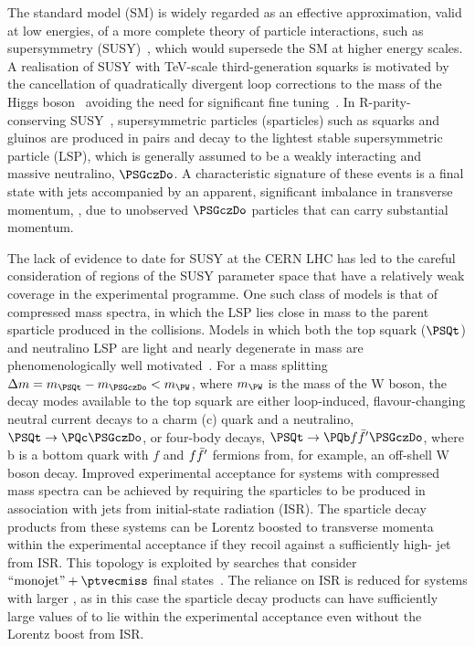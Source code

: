 The standard model (SM) is widely regarded as an effective
approximation, valid at low energies, of a more complete theory of
particle interactions, such as supersymmetry (SUSY)~\cite{ref:SUSY-1,
  ref:SUSY0, ref:SUSY1, ref:SUSY2, ref:SUSY3, ref:SUSY4,
  ref:hierarchy1, ref:hierarchy2}, which would supersede the SM at
higher energy scales. A realisation of SUSY with TeV-scale
third-generation squarks is motivated by the cancellation of
quadratically divergent loop corrections to the mass of the Higgs
boson~\cite{ref:atlashiggsdiscovery, ref:cmshiggsdiscoverylong}
avoiding the need for significant fine tuning~\cite{ref:hierarchy1,
  ref:hierarchy2, ref:barbierinsusy}. In R-parity-conserving
SUSY~\cite{Farrar:1978xj}, supersymmetric particles (sparticles) such
as squarks and gluinos are produced in pairs and decay to the lightest
stable supersymmetric particle (LSP), which is generally assumed to be
a weakly interacting and massive neutralino, $\PSGczDo$. A
characteristic signature of these events is a final state with jets
accompanied by an apparent, significant imbalance in transverse
momentum, \ptvecmiss, due to unobserved $\PSGczDo$ particles that can
carry substantial momentum.

The lack of evidence to date for SUSY at the CERN LHC has led to the
careful consideration of regions of the SUSY parameter space that have
a relatively weak coverage in the experimental programme.  One such
class of models is that of compressed mass spectra, in which the LSP
lies close in mass to the parent sparticle produced in the collisions.
Models in which both the top squark ($\PSQt$) and neutralino LSP are
light and nearly degenerate in mass are phenomenologically well
motivated~\cite{Boehm:1999tr,Boehm:1999bj,Balazs:2004bu,
  Martin:2007gf,
  Martin:2007hn,Carena:2008mj,Grober:2014aha,Grober:2015fia}.  For a
mass splitting $\dm = m_{\PSQt} - m_{\PSGczDo} < m_{\PW}$, where
$m_{\PW}$ is the mass of the W boson, the decay modes available to the
top squark are either loop-induced, flavour-changing neutral current
decays to a charm (c) quark and a neutralino, $\PSQt \to
\PQc\PSGczDo$, or four-body decays, $\PSQt \to {\PQb \ffbp} \PSGczDo$,
where b is a bottom quark with $f$ and ${f{\bar{f}'}}$ fermions from, for
example, an off-shell W boson decay. Improved experimental acceptance
for systems with compressed mass spectra can be achieved by requiring
the sparticles to be produced in association with jets from
initial-state radiation (ISR). The sparticle decay products from these
systems can be Lorentz boosted to transverse momenta within the
experimental acceptance if they recoil against a sufficiently high-\pt
jet from ISR. This topology is exploited by searches that consider
$\text{``monojet''} + \ptvecmiss$ final states~\cite{atlas-13,
  atlas-6, cms-9}. The reliance on ISR is reduced for systems with
larger \dm, as in this case the sparticle decay products can have
sufficiently large values of \pt to lie within the experimental
acceptance even without the Lorentz boost from ISR.

